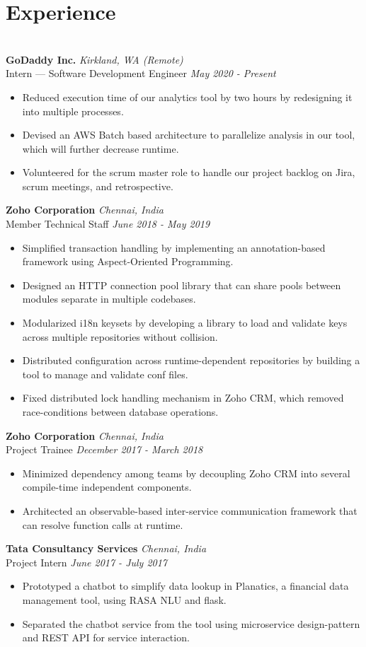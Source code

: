 \documentclass{resume}
\begin{document}
\section*{Experience}
\titlerule
\noindent
\\
\textbf{GoDaddy Inc.} \hfill \textit{Kirkland, WA (Remote)} \\
{\small Intern --- Software Development Engineer} \hfill \textit{\small May 2020 - Present}
\begin{itemize}
  \item Reduced execution time of our analytics tool by two hours by redesigning it into multiple processes.
  \item Devised an AWS Batch based architecture to parallelize analysis in our tool, which will further decrease runtime.
  \item Volunteered for the scrum master role to handle our project backlog on Jira, scrum meetings, and retrospective.
\end{itemize}
\textbf{Zoho Corporation} \hfill \textit{Chennai, India} \\
{\small Member Technical Staff} \hfill \textit{\small June 2018 - May 2019}
\begin{itemize}
  \item Simplified transaction handling by implementing an annotation-based framework using Aspect-Oriented Programming.
  \item Designed an HTTP connection pool library that can share pools between modules separate in multiple codebases.
  \item Modularized i18n keysets by developing a library to load and validate keys across multiple repositories without collision.
  \item Distributed configuration across runtime-dependent repositories by building a tool to manage and validate conf files.
  \item Fixed distributed lock handling mechanism in Zoho CRM, which removed race-conditions between database operations.
\end{itemize}
\textbf{Zoho Corporation} \hfill \textit{Chennai, India} \\
{\small Project Trainee} \hfill \textit{\small December 2017 - March 2018}
\begin{itemize}
  \item Minimized dependency among teams by decoupling Zoho CRM into several compile-time independent components.
  \item Architected an observable-based inter-service communication framework that can resolve function calls at runtime.
\end{itemize}
\textbf{Tata Consultancy Services} \hfill \textit{Chennai, India} \\
{\small Project Intern} \hfill \textit{\small June 2017 - July 2017}
\begin{itemize}
  \item Prototyped a chatbot to simplify data lookup in Planatics, a financial data management tool, using RASA NLU and flask.
  \item Separated the chatbot service from the tool using microservice design-pattern and REST API for service interaction.
\end{itemize}
\end{document}
